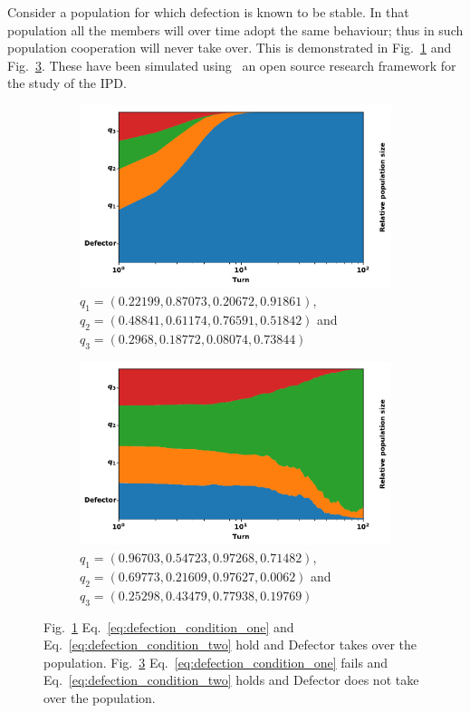 \documentclass[9pt,twocolumn,twoside,lineno]{pnas-new}
\begin{document}
Consider a population for which defection is known to be stable. In that
population all the members will over time adopt the same behaviour; thus in such
population cooperation will never take over. This is demonstrated in
Fig.~\ref{fig:stable_defection} and Fig.~\ref{fig:unstable_defection}.
These have been simulated using~\cite{axelrodproject} an open
source research framework for the study of the IPD.

\begin{figure}
    \begin{subfigure}[t]{0.5\textwidth}
        \centering
        \includegraphics[width=.8\linewidth]{population_defection_takes_over.pdf}
        \caption{\(q_{1}=(0.22199, 0.87073, 0.20672, 0.91861)\),
        $q_{2}=(0.48841, 0.61174, 0.76591, 0.51842)$ and
        $q_{3}=(0.2968, 0.18772, 0.08074, 0.73844)$}\label{fig:stable_defection}
    \end{subfigure}
    \begin{subfigure}[t]{0.5\textwidth}
        \centering
        \includegraphics[width=.8\linewidth]{population_defection_fails.pdf}
        \caption{$q_{1}=(0.96703, 0.54723, 0.97268, 0.71482)$,
        $q_{2}=(0.69773, 0.21609, 0.97627, 0.0062)$ and
        $q_{3}=(0.25298, 0.43479, 0.77938, 0.19769)$}\label{fig:unstable_defection}
    \end{subfigure}
    \caption{Fig.~\ref{fig:stable_defection} Eq.~\ref{eq:defection_condition_one} and
    Eq.~\ref{eq:defection_condition_two} hold and Defector takes over the
    population. Fig.~\ref{fig:unstable_defection} Eq.~\ref{eq:defection_condition_one} fails and
    Eq.~\ref{eq:defection_condition_two} holds and Defector does not take over
    the population.}
\end{figure}
\end{document}
